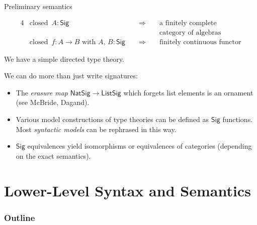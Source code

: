\documentclass[dvipsnames]{beamer}
\newcommand{\ms}[1]{\mathsf{#1}}
\newcommand{\Sig}{\mathsf{Sig}}
\begin{document}
\begin{frame}{Preliminary semantics}

\begin{block}{}
  \vspace{-1.3em}
  \begin{alignat*}{4}
    & \text{closed  }\,A : \Sig &&\,\,\Longrightarrow&& \text{ a finitely complete } \\
    &  && &&\text{ category of algebras}\\
    & \text{closed  }\,f : A \to B \text{ with } A,\,B : \Sig &&\,\,\Longrightarrow&& \text{ finitely continuous functor}
  \end{alignat*}
\end{block}
\vspace{1em}
We have a simple directed type theory.
\vspace{1em}

We can do more than just write signatures:
\begin{itemize}
\item The \emph{erasure map} $\ms{NatSig} \to \ms{ListSig}$ which forgets list elements
      is an \alert{ornament} (see McBride, Dagand).
\item Various \alert{model constructions} of type theories can be defined as $\Sig$
      functions. Most \emph{syntactic models} can be rephrased in this way.
\item $\Sig$ equivalences yield isomorphisms or equivalences of categories (depending
      on the exact semantics).
\end{itemize}
\end{frame}


\section{Lower-Level Syntax and Semantics}
\begin{frame}
  \frametitle{Outline}
  \tableofcontents[currentsection]
\end{frame}
\end{document}
